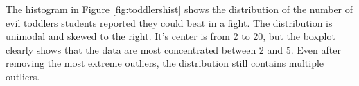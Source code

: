 \documentclass{article}
\begin{document}
\begin{figure}
\end{figure}

The histogram in Figure \ref{fig:toddlershist} shows the distribution of the
number of evil toddlers students reported they could beat in a fight. The
distribution is unimodal and skewed to the right. It's center is from 2 to 20,
but the boxplot clearly shows that the data are most concentrated between 2 and
5. Even after removing the most extreme outliers, the distribution still
contains multiple outliers.
\end{document}
